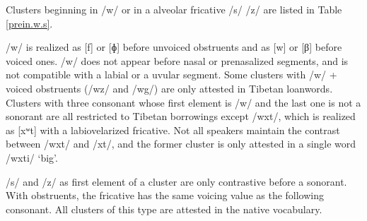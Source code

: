 \documentclass[oldfontcommands,oneside,a4paper,11pt]{article}
\begin{document}
 Clusters beginning in /w/ or in a alveolar fricative /s/ /z/ are listed in Table \ref{prein.w.s}. 
 
 /w/ is realized as [f] or [ɸ] before unvoiced obstruents and as [w] or [β] before voiced ones. /w/ does not appear before nasal or prenasalized segments, and is not compatible with a labial or a uvular segment. Some clusters with /w/ + voiced obstruents (/wz/ and /wg/) are only attested in Tibetan loanwords. Clusters with three consonant whose first element is /w/ and the last one is not a sonorant are all restricted to Tibetan borrowings except /wxt/, which is realized as [xʷt] with a labiovelarized fricative. Not all speakers maintain the contrast between /wxt/ and /xt/, and the former cluster is only attested in a single word /wxti/ `big'.
 
 /s/ and /z/ as first element of a cluster are only contrastive before a sonorant. With obstruents, the fricative has the same voicing value as the following consonant. All clusters of this type are attested in the native vocabulary.
 
\end{document}
